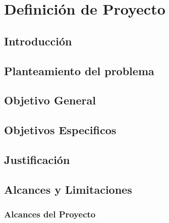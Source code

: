 \documentclass[spanish,12pt]{article}
\begin{document}
\section{Definición de Proyecto}\label{definiciuxf3n-de-proyecto}

\subsection{Introducción}\label{introducciuxf3n}

\subsection{Planteamiento del
problema}\label{planteamiento-del-problema}

\subsection{Objetivo General}\label{objetivo-general}

\subsection{Objetivos Especificos}\label{objetivos-especificos}

\subsection{Justificación}\label{justificaciuxf3n}

\subsection{Alcances y Limitaciones}\label{alcances-y-limitaciones}

\subsubsection{Alcances del Proyecto}\label{alcances-del-proyecto}
\end{document}
